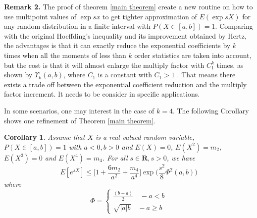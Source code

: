 \documentclass[journal]{IEEEtran}
\newtheorem{cor}{Corollary}
\begin{document}
\textbf{Remark 2.}
The proof of theorem \ref{main theorem} create a new routine on how to use multipoint values of $\exp{sx}$ to get tighter approximation of $E(\exp{sX})$ for any random distribution in a finite interval with $P(X\in [a,b])=1$.  Comparing with the original Hoeffding's inequality and its improvement obtained by Hertz,  the advantages is  that it can exactly reduce the exponential coefficients by $k$ times when all the moments of less than $k$ order statistics are taken into account, but the cost is that it will almost enlarge the multiply factor with $C_1^k$ times, as shown by $\Upsilon_k(a,b)$, where $C_1$ is a constant with $C_1>1$ . That means there exists a trade off between the exponential coefficient reduction and the multiply factor increment. It needs to be consider in specific applications.


In some scenarios, one may interest in the case of $k=4$. The following Corollary shows one refinement of Theorem \ref{main theorem}.





\begin{cor}\label{Cor k equal 4}
Assume that $X$ is a real valued random variable, $P(X\in [a, b])=1$ with $a<0, b>0$ and  $E(X)=0$, $E(X^2)=m_2$, $E(X^3)=0$ and $E(X^4)=m_4$.  For all $s\in \textbf{R}, s>0$, we have
\begin{equation}\label{hoeffding inequality3}
  E[e^{sX}]\leq \Big[1+\frac{6m_2}{a^2}+\frac{m_4}{a^4}\Big] \exp\Big(\frac{s^2}{8}\Phi^2(a,b)\Big)
\end{equation}
where \begin{equation}
  \Phi = \begin{cases} \frac{(b-a)}{2} \quad  -a<b \\
      \sqrt{|a|b} \quad -a \geq b
  \end{cases}
\end{equation}
\end{cor}
\end{document}
